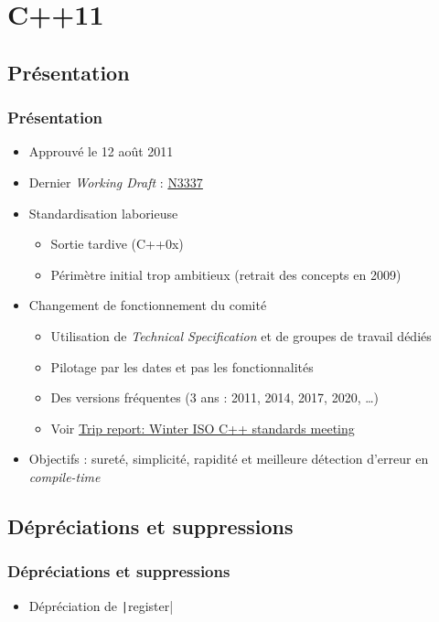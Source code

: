 \documentclass[C++.tex]{subfiles}
\begin{document}
\section{C++11}
\subsection*{Présentation}
\begin{frame}
	\frametitle{Présentation}
	\begin{itemize}
		\item Approuvé le 12 août 2011
		\item Dernier \textit{Working Draft} : \href{http://www.open-std.org/jtc1/sc22/wg21/docs/papers/2012/n3337.pdf}{N3337\linklogo}
		\item Standardisation laborieuse
		\begin{itemize}
			\item Sortie tardive (C++0x)
			\item Périmètre initial trop ambitieux (retrait des concepts en 2009)
		\end{itemize}
		\item Changement de fonctionnement du comité
		\begin{itemize}
			\item Utilisation de \textit{Technical Specification} et de groupes de travail dédiés
			\item Pilotage par les dates et pas les fonctionnalités
			\item Des versions fréquentes (3 ans : 2011, 2014, 2017, 2020, \ldots{})
			\item Voir \href{https://herbsutter.com/2016/03/11/trip-report-winter-iso-c-standards-meeting/}{Trip report: Winter ISO C++ standards meeting\linklogo}
		\end{itemize}
		\item Objectifs : sureté, simplicité, rapidité et meilleure détection d'erreur en \textit{compile-time}

	\end{itemize}
\end{frame}

\subsection*{Dépréciations et suppressions}
\begin{frame}[fragile]
	\frametitle{Dépréciations et suppressions}
	\begin{itemize}
		\item Dépréciation de \texttt|register|

	\end{itemize}
\end{frame}
\end{document}
